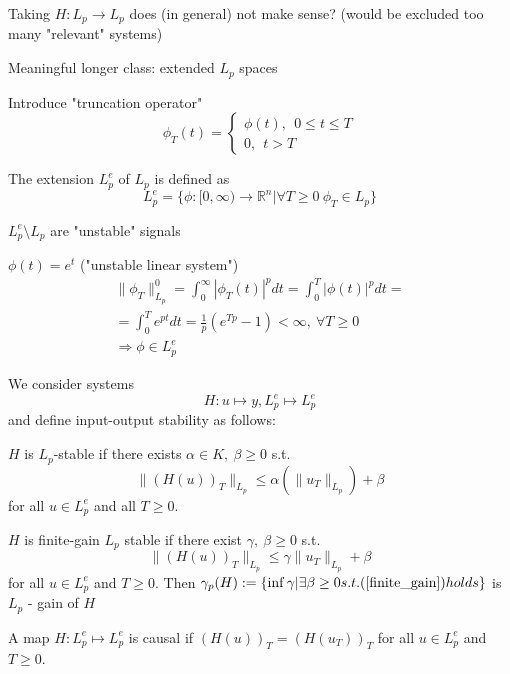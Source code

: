 Taking $H: L_p \to L_p$ does (in general) not make sense? (would be excluded too many "relevant" systems)

Meaningful longer class: extended $L_p$ spaces

Introduce "truncation operator"
\begin{equation*}
\phi_T(t) = \left\{
                \begin{array}{ll}
                  \phi (t), \ \ 0 \leq t \leq T\\
                  0, \ \ t > T
                \end{array}
              \right. 
\end{equation*}

The extension $L^e_p$ of $L_p$ is defined as 
\begin{equation*}
L^e_p = \{ \phi: [0,\infty) \to \mathbb{R}^n | \forall T \geq 0 \ \phi_T \in L_p\}
\end{equation*}

$L^e_p \setminus L_p$ are "unstable" signals

\begin{Example}
$\phi (t) = e^t $ ("unstable linear system")
\begin{equation*}
\begin{split}
\|\phi_T\|^0_{L_p} = \int_0^{\infty} |\phi_T(t)|^pdt = \int_0^T|\phi(t)|^pdt =  \\
= \int_0^Te^{pt}dt = \frac{1}{p}(e^{Tp} - 1) < \infty, \ \forall T \geq 0 \\
\Rightarrow \phi \in L_p^e 
\end{split}
\end{equation*}
\end{Example}

We consider systems 
\begin{equation*}
H: u \mapsto y, L_p^e \mapsto L_p^e
\end{equation*}
and define input-output stability as follows:
\begin{Definition}
$H$ is $L_p$-stable if there exists $\alpha \in K, \ \beta \geq 0$ s.t. 
\begin{equation*}
\|(H(u))_T\|_{L_p} \leq \alpha (\|u_T\|_{L_p}) + \beta
\end{equation*}
for all $u \in L^e_p$ and all $T \geq 0$. 

$H$ is finite-gain $L_p$ stable if there exist $\gamma, \ \beta \geq 0$ s.t. 
\begin{equation}\label{finite_gain}
\|(H(u))_T\|_{L_p} \leq \gamma \|u_T\|_{L_p} + \beta 
\end{equation}
for all $u \in L_p^e$ and $T \geq 0$. Then $\gamma_p(H) := \{ \inf \gamma | \exists \beta \geq 0 s.t. (\ref{finite_gain}) holds\}$ is $L_p$ - gain of $H$
\end{Definition}
\begin{Definition}
A map $H: L_p^e \mapsto L_p^e$ is causal if $(H(u))_T = (H(u_T))_T$ for all $u \in L_p^e$ and $T \geq 0$. 
\end{Definition}

